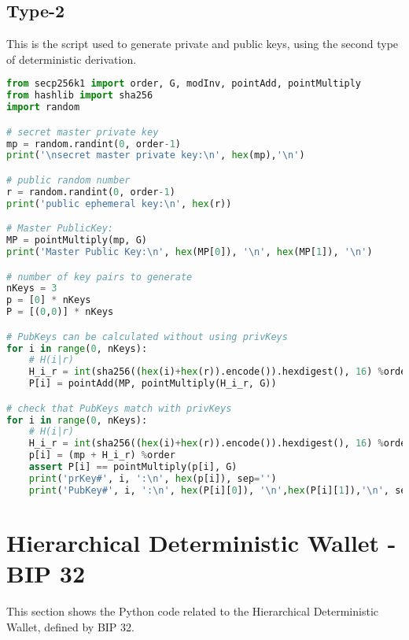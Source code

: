 \subsection{Type-2}
\begin{flushleft}
	This is the script used to generate private and public keys, using the second type of deterministic derivation.
\end{flushleft}
\begin{lstlisting}[language=Python]
from secp256k1 import order, G, modInv, pointAdd, pointMultiply
from hashlib import sha256
import random

# secret master private key
mp = random.randint(0, order-1)
print('\nsecret master private key:\n', hex(mp),'\n')

# public random number
r = random.randint(0, order-1)
print('public ephemeral key:\n', hex(r))

# Master PublicKey:
MP = pointMultiply(mp, G)
print('Master Public Key:\n', hex(MP[0]), '\n', hex(MP[1]), '\n')

# number of key pairs to generate
nKeys = 3
p = [0] * nKeys
P = [(0,0)] * nKeys

# PubKeys can be calculated without using privKeys
for i in range(0, nKeys):
	# H(i|r)
	H_i_r = int(sha256((hex(i)+hex(r)).encode()).hexdigest(), 16) %order
	P[i] = pointAdd(MP, pointMultiply(H_i_r, G))                 

# check that PubKeys match with privKeys
for i in range(0, nKeys):
	# H(i|r)
	H_i_r = int(sha256((hex(i)+hex(r)).encode()).hexdigest(), 16) %order
	p[i] = (mp + H_i_r) %order
	assert P[i] == pointMultiply(p[i], G)
	print('prKey#', i, ':\n', hex(p[i]), sep='')
	print('PubKey#', i, ':\n', hex(P[i][0]), '\n',hex(P[i][1]),'\n', sep='')
\end{lstlisting}


\section{Hierarchical Deterministic Wallet - BIP 32}

\begin{flushleft}
	This section shows the Python code related to the Hierarchical Deterministic Wallet, defined by BIP 32.
\end{flushleft}

